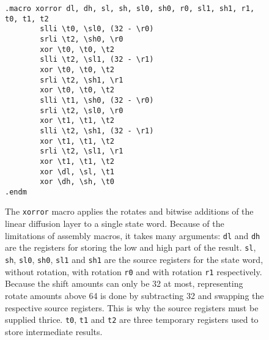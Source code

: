 \begin{figure}
\begin{verbatim}
.macro xorror dl, dh, sl, sh, sl0, sh0, r0, sl1, sh1, r1, t0, t1, t2
        slli \t0, \sl0, (32 - \r0)
        srli \t2, \sh0, \r0
        xor \t0, \t0, \t2
        slli \t2, \sl1, (32 - \r1)
        xor \t0, \t0, \t2
        srli \t2, \sh1, \r1
        xor \t0, \t0, \t2
        slli \t1, \sh0, (32 - \r0)
        srli \t2, \sl0, \r0
        xor \t1, \t1, \t2
        slli \t2, \sh1, (32 - \r1)
        xor \t1, \t1, \t2
        srli \t2, \sl1, \r1
        xor \t1, \t1, \t2
        xor \dl, \sl, \t1
        xor \dh, \sh, \t0
.endm
\end{verbatim}

\caption{The \texttt{xorror} macro applies the rotates and bitwise additions of
the linear diffusion layer to a single state word. Because of the limitations of
assembly macros, it takes many arguments:
\texttt{dl} and \texttt{dh} are the registers for storing the low and high part
of the result. \texttt{sl}, \texttt{sh}, \texttt{sl0}, \texttt{sh0},
\texttt{sl1} and \texttt{sh1} are the source registers for the state word,
without rotation, with rotation \texttt{r0} and with rotation \texttt{r1}
respectively. Because the shift amounts can only be 32 at most, representing
rotate amounts above 64 is done by subtracting 32 and swapping the respective
source registers. This is why the source registers must be supplied thrice.
\texttt{t0}, \texttt{t1} and \texttt{t2} are three temporary registers used to
store intermediate results.}
\label{xorror}
\end{figure}
